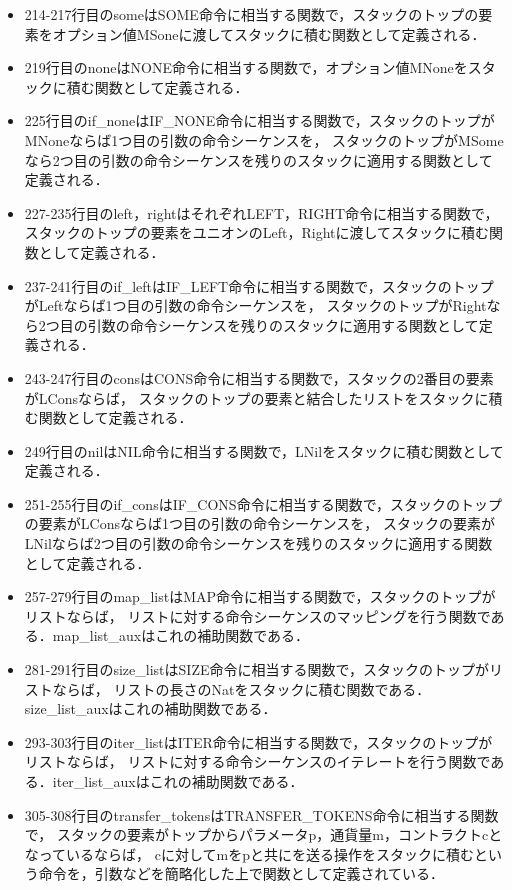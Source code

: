 \documentclass{kuisthesis}
\begin{document}
\begin{itemize}
  \item 214-217行目のsomeはSOME命令に相当する関数で，スタックのトップの要素をオプション値MSoneに渡してスタックに積む関数として定義される．
  \item 219行目のnoneはNONE命令に相当する関数で，オプション値MNoneをスタックに積む関数として定義される．
  \item 225行目のif\_noneはIF\_NONE命令に相当する関数で，スタックのトップがMNoneならば1つ目の引数の命令シーケンスを，
  スタックのトップがMSomeなら2つ目の引数の命令シーケンスを残りのスタックに適用する関数として定義される．
  \item 227-235行目のleft，rightはそれぞれLEFT，RIGHT命令に相当する関数で，
  スタックのトップの要素をユニオンのLeft，Rightに渡してスタックに積む関数として定義される．
  \item 237-241行目のif\_leftはIF\_LEFT命令に相当する関数で，スタックのトップがLeftならば1つ目の引数の命令シーケンスを，
  スタックのトップがRightなら2つ目の引数の命令シーケンスを残りのスタックに適用する関数として定義される．
  \item 243-247行目のconsはCONS命令に相当する関数で，スタックの2番目の要素がLConsならば，
  スタックのトップの要素と結合したリストをスタックに積む関数として定義される．
  \item 249行目のnilはNIL命令に相当する関数で，LNilをスタックに積む関数として定義される．
  \item 251-255行目のif\_consはIF\_CONS命令に相当する関数で，スタックのトップの要素がLConsならば1つ目の引数の命令シーケンスを，
  スタックの要素がLNilならば2つ目の引数の命令シーケンスを残りのスタックに適用する関数として定義される．
  \item 257-279行目のmap\_listはMAP命令に相当する関数で，スタックのトップがリストならば，
  リストに対する命令シーケンスのマッピングを行う関数である．map\_list\_auxはこれの補助関数である．
  \item 281-291行目のsize\_listはSIZE命令に相当する関数で，スタックのトップがリストならば，
  リストの長さのNatをスタックに積む関数である．\\size\_list\_auxはこれの補助関数である．
  \item 293-303行目のiter\_listはITER命令に相当する関数で，スタックのトップがリストならば，
  リストに対する命令シーケンスのイテレートを行う関数である．iter\_list\_auxはこれの補助関数である．
  \item 305-308行目のtransfer\_tokensはTRANSFER\_TOKENS命令に相当する関数で，
  スタックの要素がトップからパラメータp，通貨量m，コントラクトcとなっているならば，
  cに対してmをpと共にを送る操作をスタックに積むという命令を，引数などを簡略化した上で関数として定義されている．

\end{itemize}
\end{document}
